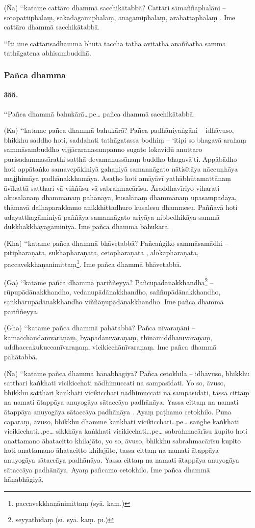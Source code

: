 (Ña) ‘‘katame cattāro dhammā sacchikātabbā? Cattāri sāmaññaphalāni – sotāpattiphalaṃ, sakadāgāmiphalaṃ, anāgāmiphalaṃ, arahattaphalaṃ . Ime cattāro dhammā sacchikātabbā.

‘‘Iti ime cattārīsadhammā bhūtā tacchā tathā avitathā anaññathā sammā tathāgatena abhisambuddhā.

\subsubsection{Pañca dhammā}

\paragraph{355.} ‘‘Pañca dhammā bahukārā…pe… pañca dhammā sacchikātabbā.

(Ka) ‘‘katame pañca dhammā bahukārā? Pañca padhāniyaṅgāni – idhāvuso, bhikkhu saddho hoti, saddahati tathāgatassa bodhiṃ – ‘itipi so bhagavā arahaṃ sammāsambuddho vijjācaraṇasampanno sugato lokavidū anuttaro purisadammasārathi satthā devamanussānaṃ buddho bhagavā’ti. Appābādho hoti appātaṅko samavepākiniyā gahaṇiyā samannāgato nātisītāya nāccuṇhāya majjhimāya padhānakkhamāya. Asaṭho hoti amāyāvī yathābhūtamattānaṃ āvīkattā satthari vā viññūsu vā sabrahmacārīsu. Āraddhavīriyo viharati akusalānaṃ dhammānaṃ pahānāya, kusalānaṃ dhammānaṃ upasampadāya, thāmavā daḷhaparakkamo anikkhittadhuro kusalesu dhammesu. Paññavā hoti udayatthagāminiyā paññāya samannāgato ariyāya nibbedhikāya sammā dukkhakkhayagāminiyā. Ime pañca dhammā bahukārā.

(Kha) ‘‘katame pañca dhammā bhāvetabbā? Pañcaṅgiko sammāsamādhi – pītipharaṇatā, sukhapharaṇatā, cetopharaṇatā , ālokapharaṇatā, paccavekkhaṇanimittaṃ\footnote{paccavekkhaṇānimittaṃ (syā. kaṃ.)}. Ime pañca dhammā bhāvetabbā.

(Ga) ‘‘katame pañca dhammā pariññeyyā? Pañcupādānakkhandhā\footnote{seyyathīdaṃ (sī. syā. kaṃ. pī.)} – rūpupādānakkhandho, vedanupādānakkhandho, saññupādānakkhandho, saṅkhārupādānakkhandho viññāṇupādānakkhandho. Ime pañca dhammā pariññeyyā.

(Gha) ‘‘katame pañca dhammā pahātabbā? Pañca nīvaraṇāni – kāmacchandanīvaraṇaṃ, byāpādanīvaraṇaṃ, thinamiddhanīvaraṇaṃ, uddhaccakukuccanīvaraṇaṃ, vicikicchānīvaraṇaṃ. Ime pañca dhammā pahātabbā.

(Ṅa) ‘‘katame pañca dhammā hānabhāgiyā? Pañca cetokhilā – idhāvuso, bhikkhu satthari kaṅkhati vicikicchati nādhimuccati na sampasīdati. Yo so, āvuso, bhikkhu satthari kaṅkhati vicikicchati nādhimuccati na sampasīdati, tassa cittaṃ na namati ātappāya anuyogāya sātaccāya padhānāya. Yassa cittaṃ na namati ātappāya anuyogāya sātaccāya padhānāya . Ayaṃ paṭhamo cetokhilo. Puna caparaṃ, āvuso, bhikkhu dhamme kaṅkhati vicikicchati…pe… saṅghe kaṅkhati vicikicchati…pe… sikkhāya kaṅkhati vicikicchati…pe… sabrahmacārīsu kupito hoti anattamano āhatacitto khilajāto, yo so, āvuso, bhikkhu sabrahmacārīsu kupito hoti anattamano āhatacitto khilajāto, tassa cittaṃ na namati ātappāya anuyogāya sātaccāya padhānāya. Yassa cittaṃ na namati ātappāya anuyogāya sātaccāya padhānāya. Ayaṃ pañcamo cetokhilo. Ime pañca dhammā hānabhāgiyā.

